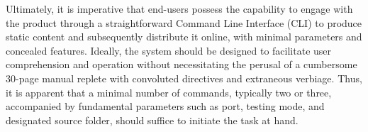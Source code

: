 {}Ultimately, it is imperative that end-users possess the capability to engage with the product through a straightforward Command Line Interface (CLI) to produce static content and subsequently distribute it online, with minimal parameters and concealed features. Ideally, the system should be designed to facilitate user comprehension and operation without necessitating the perusal of a cumbersome 30-page manual replete with convoluted directives and extraneous verbiage. Thus, it is apparent that a minimal number of commands, typically two or three, accompanied by fundamental parameters such as port, testing mode, and designated source folder, should suffice to initiate the task at hand.\markdownRendererDocumentEnd